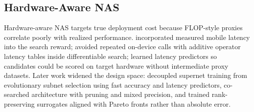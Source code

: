\documentclass[11pt]{article}
\begin{document}
\subsection{Hardware-Aware NAS}

Hardware-aware NAS targets true deployment cost because FLOP-style proxies correlate poorly with realized performance.
\citet{tan2019mnasnet} incorporated measured mobile latency into the search reward; \citet{wu2019fbnet} avoided repeated on-device calls with additive operator latency tables inside differentiable search; \citet{cai2018proxylessnas} learned latency predictors so candidates could be scored on target hardware without intermediate proxy datasets.
Later work widened the design space: \citet{cai2019once} decoupled supernet training from evolutionary subnet selection using fast accuracy and latency predictors, \citet{wang2020apq} co-searched architecture with pruning and mixed precision, and \citet{benmeziane2023multi} trained rank-preserving surrogates aligned with Pareto fronts rather than absolute error.


\end{document}
